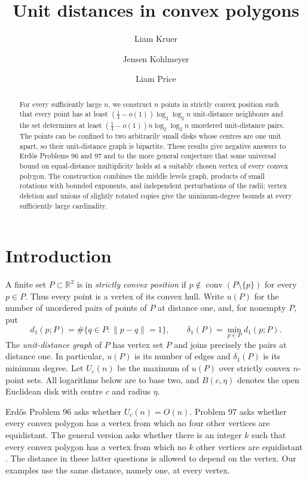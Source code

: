 \documentclass[a4paper,11pt]{amsart}
\title{Unit distances in convex polygons}
\author{Liam Kruer}
\author{Jensen Kohlmeyer}
\author{Liam Price}
\date{}
\theoremstyle{remark}
\DeclareMathOperator{\conv}{conv}
\newcommand{\R}{\mathbb R}
\begin{document}
\begin{abstract}
For every sufficiently large $n$, we construct $n$ points in strictly convex
position such that every point has at least
$(\frac14-o(1))\log_2\log_2 n$ unit-distance neighbours and the set determines
at least $(\frac14-o(1))n\log_2\log_2 n$ unordered unit-distance pairs.
The points can be confined to two arbitrarily small disks whose centres are
one unit apart, so their unit-distance graph is bipartite.
These results give negative answers to Erd\H{o}s Problems 96 and 97 and to
the more general conjecture that some universal bound on equal-distance
multiplicity holds at a suitably chosen vertex of every convex polygon.
The construction combines the middle levels graph, products of small
rotations with bounded exponents, and independent perturbations of the radii; vertex deletion
and unions of slightly rotated copies give the minimum-degree bounds at
every sufficiently large cardinality.
\end{abstract}
\maketitle

\section{Introduction}

A finite set $P\subset\R^2$ is in \emph{strictly convex position} if
$p\notin\conv(P\setminus\{p\})$ for every $p\in P$.
Thus every point is a vertex of its convex hull.
Write $u(P)$ for the number of unordered pairs of points of $P$ at distance
one, and, for nonempty $P$, put
\[
 d_1(p;P)=\#\{q\in P:\|p-q\|=1\},\qquad
 \delta_1(P)=\min_{p\in P}d_1(p;P).
\]
The \emph{unit-distance graph} of $P$ has vertex set $P$ and joins precisely
the pairs at distance one. In particular, $u(P)$ is its number of edges and
$\delta_1(P)$ is its minimum degree. Let $U_c(n)$ be the maximum of $u(P)$
over strictly convex $n$-point sets. All logarithms below are to base two,
and $B(c,\eta)$ denotes the open Euclidean disk with centre $c$ and radius
$\eta$.

Erd\H{o}s Problem 96 asks whether $U_c(n)=O(n)$.
Problem 97 asks whether every convex polygon has a vertex from which no
four other vertices are equidistant. The general version asks whether
there is an integer $k$ such that every convex polygon has a vertex from
which no $k$ other vertices are equidistant
\cite{Bloom96,Bloom97,FormalConjectures}.
The distance in these latter questions is allowed to depend on the vertex.
Our examples use the same distance, namely one, at every vertex.
\end{document}
